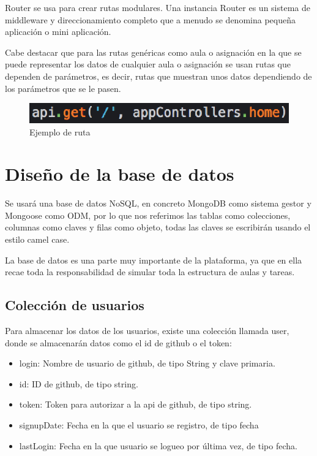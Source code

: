 Router se usa para crear rutas modulares. Una instancia Router es un sistema de middleware y direccionamiento completo que a menudo se denomina pequeña aplicación o mini aplicación.

Cabe destacar que para las rutas genéricas como aula o asignación en la que se puede representar los datos de cualquier aula o asignación se usan rutas que dependen de parámetros, es decir, rutas que muestran unos datos dependiendo de los parámetros que se le pasen.

\begin{figure}[!th]
\begin{center}
\includegraphics[scale=1.0]{images/ruta}
\caption{Ejemplo de ruta}
\label{fig:Ejemplo de ruta}
\end{center}
\end{figure}


\section{Diseño de la base de datos}
\label{:sec4}

Se usará una base de datos NoSQL, en concreto MongoDB como sistema gestor y Mongoose como ODM, por lo que nos referimos las tablas como colecciones, columnas como claves y filas como objeto, todas las claves se escribirán usando el estilo camel case.

La base de datos es una parte muy importante de la plataforma, ya que en ella recae toda la responsabilidad de simular toda la estructura de aulas y tareas.

\subsection{Colección de usuarios}
\label{3:4:1}

Para almacenar los datos de los usuarios, existe una colección llamada user, donde se almacenarán datos como el id de github o el token:

\begin{itemize}
  \item login: Nombre de usuario de github, de tipo String y clave primaria.
  \item id: ID de github, de tipo string.
  \item token: Token para autorizar a la api de github, de tipo string.
  \item signupDate: Fecha en la que el usuario se registro, de tipo fecha
  \item lastLogin: Fecha en la que usuario se logueo por última vez, de tipo fecha.
\end{itemize}


